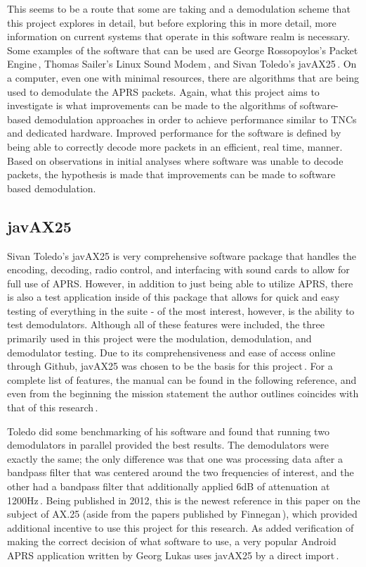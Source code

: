 This seems to be a route that some are taking and a demodulation scheme that this project explores in detail, but before exploring this in more detail, more information on current systems that operate in this software realm is necessary. Some examples of the software that can be used are George Rossopoylos's Packet Engine\,\cite{Rossopoylos}, Thomas Sailer's Linux Sound Modem\,\cite{Sailer1997,Sailer2000}, and Sivan Toledo's javAX25\,\cite{javax25github, Toledo2012a}. On a computer, even one with minimal resources, there are algorithms that are being used to demodulate the APRS packets. Again, what this project aims to investigate is what improvements can be made to the algorithms of software-based demodulation approaches in order to achieve performance similar to TNCs and dedicated hardware. Improved performance for the software is defined by being able to correctly decode more packets in an efficient, real time, manner. Based on observations in initial analyses where software was unable to decode packets, the hypothesis is made that improvements can be made to software based demodulation.

\subsection{javAX25}
Sivan Toledo's javAX25 is very comprehensive software package that handles the encoding, decoding, radio control, and interfacing with sound cards to allow for full use of APRS. However, in addition to just being able to utilize APRS, there is also a test application inside of this package that allows for quick and easy testing of everything in the suite - of the most interest, however, is the ability to test demodulators. Although all of these features were included, the three primarily used in this project were the modulation, demodulation, and demodulator testing. Due to its comprehensiveness and ease of access online through Github, javAX25 was chosen to be the basis for this project\,\cite{javax25github}. For a complete list of features, the manual can be found in the following reference, and even from the beginning the mission statement the author outlines coincides with that of this research\,\cite{Toledo2012a}.

Toledo did some benchmarking of his software and found that running two demodulators in parallel provided the best results. The demodulators were exactly the same; the only difference was that one was processing data after a bandpass filter that was centered around the two frequencies of interest, and the other had a bandpass filter that additionally applied 6dB of attenuation at 1200Hz\,\cite{Toledo2012}. Being published in 2012, this is the newest reference in this paper on the subject of AX.25 (aside from the papers published by Finnegan\,\cite{KWFThesis, KWFTAPR}), which provided additional incentive to use this project for this research. As added verification of making the correct decision of what software to use, a very popular Android APRS application written by Georg Lukas uses javAX25 by a direct import\,\cite{APRSdroid}.

